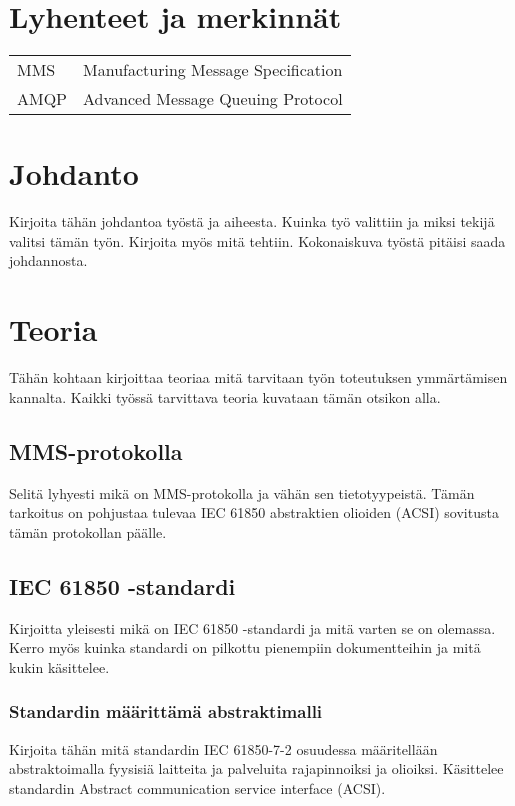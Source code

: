\documentclass[globalnumbering,centeredcaptions,draftfooter]{tutthesis} %
\begin{document}
\chapter*{Lyhenteet ja merkinnät}

\begin{tabular}[h]{@{} p{} p{} @{}}
MMS & Manufacturing Message Specification \\
AMQP & Advanced Message Queuing Protocol \\
\end{tabular}


\chapter{Johdanto}
\label{ch:johdanto}
Kirjoita tähän johdantoa työstä ja aiheesta. Kuinka työ valittiin ja miksi tekijä valitsi tämän työn. Kirjoita myös mitä tehtiin. Kokonaiskuva työstä pitäisi saada johdannosta.


\chapter{Teoria}
\label{ch:teoria}
Tähän kohtaan kirjoittaa teoriaa mitä tarvitaan työn toteutuksen ymmärtämisen kannalta. Kaikki työssä tarvittava teoria kuvataan tämän otsikon alla.

\section{MMS-protokolla}
Selitä lyhyesti mikä on MMS-protokolla ja vähän sen tietotyypeistä. Tämän tarkoitus on pohjustaa tulevaa IEC 61850 abstraktien olioiden (ACSI) sovitusta tämän protokollan päälle.

\section{IEC 61850 -standardi}
Kirjoitta yleisesti mikä on IEC 61850 -standardi ja mitä varten se on olemassa. Kerro myös kuinka standardi on pilkottu pienempiin dokumentteihin ja mitä kukin käsittelee.

\subsection{Standardin määrittämä abstraktimalli}
Kirjoita tähän mitä standardin IEC 61850-7-2 osuudessa määritellään abstraktoimalla fyysisiä laitteita ja palveluita rajapinnoiksi ja olioiksi. Käsittelee standardin Abstract communication service interface (ACSI).
\end{document}
